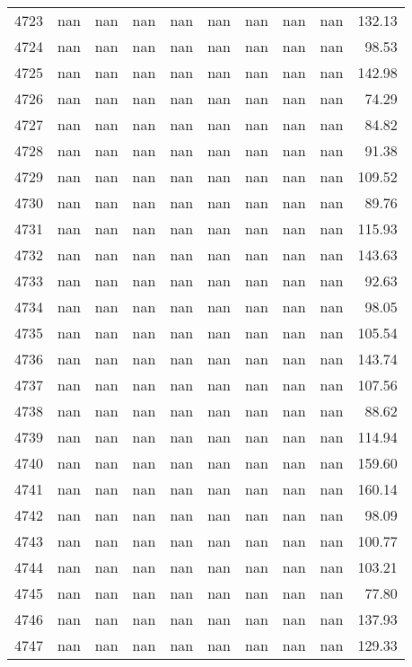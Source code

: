 \begin{tabular}{lrrrrrrrrr}
4723 & nan & nan & nan & nan & nan & nan & nan & nan & 132.13 \\
4724 & nan & nan & nan & nan & nan & nan & nan & nan & 98.53 \\
4725 & nan & nan & nan & nan & nan & nan & nan & nan & 142.98 \\
4726 & nan & nan & nan & nan & nan & nan & nan & nan & 74.29 \\
4727 & nan & nan & nan & nan & nan & nan & nan & nan & 84.82 \\
4728 & nan & nan & nan & nan & nan & nan & nan & nan & 91.38 \\
4729 & nan & nan & nan & nan & nan & nan & nan & nan & 109.52 \\
4730 & nan & nan & nan & nan & nan & nan & nan & nan & 89.76 \\
4731 & nan & nan & nan & nan & nan & nan & nan & nan & 115.93 \\
4732 & nan & nan & nan & nan & nan & nan & nan & nan & 143.63 \\
4733 & nan & nan & nan & nan & nan & nan & nan & nan & 92.63 \\
4734 & nan & nan & nan & nan & nan & nan & nan & nan & 98.05 \\
4735 & nan & nan & nan & nan & nan & nan & nan & nan & 105.54 \\
4736 & nan & nan & nan & nan & nan & nan & nan & nan & 143.74 \\
4737 & nan & nan & nan & nan & nan & nan & nan & nan & 107.56 \\
4738 & nan & nan & nan & nan & nan & nan & nan & nan & 88.62 \\
4739 & nan & nan & nan & nan & nan & nan & nan & nan & 114.94 \\
4740 & nan & nan & nan & nan & nan & nan & nan & nan & 159.60 \\
4741 & nan & nan & nan & nan & nan & nan & nan & nan & 160.14 \\
4742 & nan & nan & nan & nan & nan & nan & nan & nan & 98.09 \\
4743 & nan & nan & nan & nan & nan & nan & nan & nan & 100.77 \\
4744 & nan & nan & nan & nan & nan & nan & nan & nan & 103.21 \\
4745 & nan & nan & nan & nan & nan & nan & nan & nan & 77.80 \\
4746 & nan & nan & nan & nan & nan & nan & nan & nan & 137.93 \\
4747 & nan & nan & nan & nan & nan & nan & nan & nan & 129.33 \\

\end{tabular}
